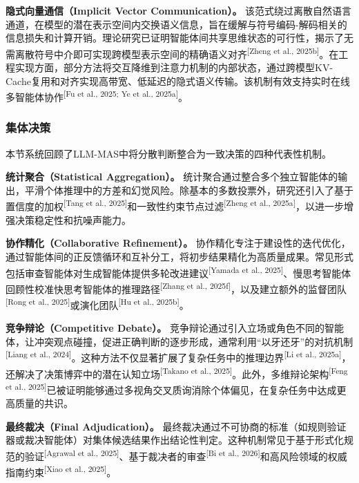 \documentclass[UTF8,a4paper,12pt]{article}
\begin{document}
\textbf{隐式向量通信（Implicit Vector Communication）。} 该范式绕过离散自然语言通道，在模型的潜在表示空间内交换语义信息，旨在缓解与符号编码-解码相关的信息损失和计算开销。理论研究已证明智能体间共享思维状态的可行性，揭示了无需离散符号中介即可实现跨模型表示空间的精确语义对齐\textsuperscript{[Zheng et al., 2025b]}。在工程实现方面，部分方法将交互降维到注意力机制的内部状态，通过跨模型KV-Cache复用和对齐实现高带宽、低延迟的隐式语义传输。该机制有效支持实时在线多智能体协作\textsuperscript{[Fu et al., 2025; Ye et al., 2025a]}。

\subsubsection{集体决策}

本节系统回顾了LLM-MAS中将分散判断整合为一致决策的四种代表性机制。

\textbf{统计聚合（Statistical Aggregation）。} 统计聚合通过整合多个独立智能体的输出，平滑个体推理中的方差和幻觉风险。除基本的多数投票外，研究还引入了基于置信度的加权\textsuperscript{[Tang et al., 2025]}和一致性约束节点过滤\textsuperscript{[Zheng et al., 2025a]}，以进一步增强决策稳定性和抗噪声能力。

\textbf{协作精化（Collaborative Refinement）。} 协作精化专注于建设性的迭代优化，通过智能体间的正反馈循环和互补分工，将初步结果精化为高质量成果。常见形式包括审查智能体对生成智能体提供多轮改进建议\textsuperscript{[Yamada et al., 2025]}、慢思考智能体回顾性校准快思考智能体的推理路径\textsuperscript{[Zhang et al., 2025f]}，以及建立额外的监督团队\textsuperscript{[Rong et al., 2025]}或演化团队\textsuperscript{[Hu et al., 2025b]}。

\textbf{竞争辩论（Competitive Debate）。} 竞争辩论通过引入立场或角色不同的智能体，让冲突观点碰撞，促进正确判断的逐步形成，通常利用``以牙还牙''的对抗机制\textsuperscript{[Liang et al., 2024]}。这种方法不仅显著扩展了复杂任务中的推理边界\textsuperscript{[Li et al., 2025a]}，还解决了决策博弈中的潜在认知立场\textsuperscript{[Takano et al., 2025]}。此外，多维辩论架构\textsuperscript{[Feng et al., 2025]}已被证明能够通过多视角交叉质询消除个体偏见，在复杂任务中达成更高质量的共识。

\textbf{最终裁决（Final Adjudication）。} 最终裁决通过不可协商的标准（如规则验证器或裁决智能体）对集体候选结果作出结论性判定。这种机制常见于基于形式化规范的验证\textsuperscript{[Agrawal et al., 2025]}、基于裁决者的审查\textsuperscript{[Bi et al., 2026]}和高风险领域的权威指南约束\textsuperscript{[Xiao et al., 2025]}。

\newpage
\end{document}
